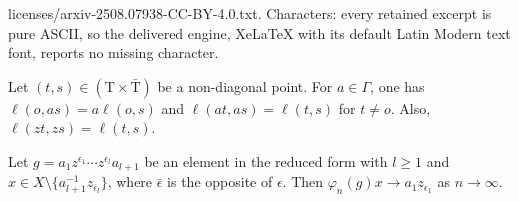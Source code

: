 \documentclass[10pt,a4paper]{amsart}
\newcommand{\Ga}{\Gamma}
\newcommand{\Tree}{\mathrm{T}}
\newcommand{\vp}{\varphi}
\begin{document}
licenses/arxiv-2508.07938-CC-BY-4.0.txt. Characters: every retained excerpt is pure ASCII, so the delivered engine, XeLaTeX with its default Latin Modern text font, reports no missing character.
\begin{lem}\label{lem:labelequiv}
Let $(t,s)\in (\Tree\times\bar{\Tree})$ 
be a non-diagonal point. 
For $a\in\Ga$, one has $\ell(o,as)=a\ell(o,s)$ 
and $\ell(at,as) = \ell(t,s)$ for $t\neq o$. 
Also, $\ell(zt,zs)=\ell(t,s)$. 
\end{lem}

\begin{lem}\label{lem:pingpong}
Let $g=a_1z^{\epsilon_1} \cdots z^{\epsilon_l}a_{l+1}$ 
be an element in the reduced form with $l\geq1$ 
and $x\in X \setminus\{a_{l+1}^{-1} z_{\bar{\epsilon}_l}\}$, 
where $\bar{\epsilon}$ is the opposite of $\epsilon$. 
Then $\vp_n(g) x \to a_1z_{\epsilon_1}$ as $n\to\infty$.
\end{lem}
\end{document}
